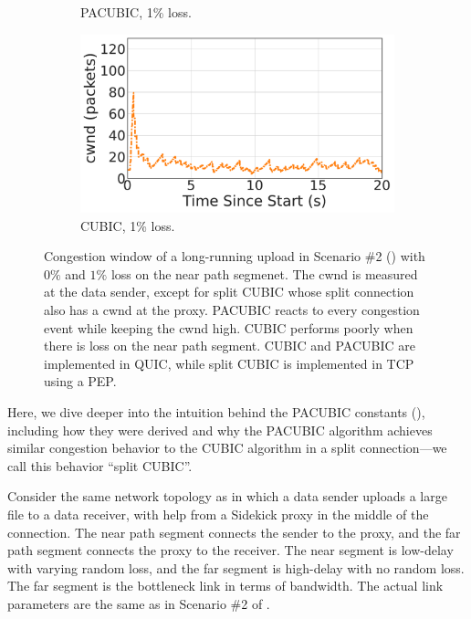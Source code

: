 \begin{figure}[h]
\begin{subfigure}{0.32\linewidth}
	\caption{PACUBIC, 1\% loss.}
	\label{fig:time-cwnd:pacubic-loss1p}
\end{subfigure}
\begin{subfigure}{0.32\linewidth}
	\includegraphics[width=\linewidth]{sidekick-paper/figures/cwnd/cwnd_cubic_loss1p.pdf}
	\caption{CUBIC, 1\% loss.}
	\label{fig:time-cwnd:cubic-loss1p}
\end{subfigure}
\caption{Congestion window of a long-running upload in Scenario \#2
() with $0\%$ and $1\%$ loss on the near
path segmenet.
The cwnd is measured at the data sender,
except for split CUBIC whose split connection also has a cwnd at the proxy.
PACUBIC reacts to every congestion event while keeping the cwnd high.
CUBIC performs poorly when there is loss on the near path segment.
CUBIC and PACUBIC are implemented in QUIC, while split CUBIC is implemented
in TCP using a PEP.
}
\label{fig:time-cwnd}
\end{figure}

Here, we dive deeper into the intuition behind the PACUBIC constants
(), including how they were derived and why the PACUBIC
algorithm achieves similar congestion behavior to the CUBIC algorithm in a split
connection---we call this behavior ``split CUBIC''.

Consider the same network topology as  in which a
data sender uploads a large file to a data receiver, with help from a Sidekick
proxy in the middle of the connection. The near path segment connects the sender
to the proxy, and the far path segment connects the proxy to the receiver.
The near segment is low-delay with varying random loss, and the far segment is
high-delay with no random loss. The far segment is the bottleneck link in terms
of bandwidth.
The actual link parameters are the same as in Scenario \#2 of
.

